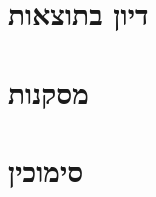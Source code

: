 \documentclass{article}
\begin{document}

\section{דיון בתוצאות}

\section{מסקנות}

\section*{סימוכין}
\begin{english}
\printbibliography[heading=none]{}
\end{english}
\end{document}
